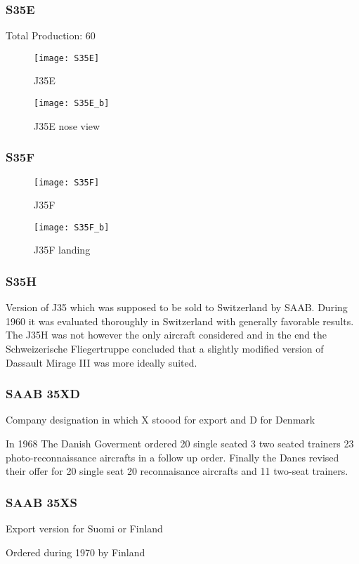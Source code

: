 \subsubsection{S35E}
    \begin{itemize*}
        \item Total Production: 60
    \end{itemize*}


\begin{figure}[H]
    \centering
    \texttt{[image: S35E]}
    \caption{J35E}
\end{figure}
\begin{figure}[H]
    \centering
    \texttt{[image: S35E\_b]}
    \caption{J35E nose view}
\end{figure}

\subsubsection{S35F}
\begin{figure}[H]
    \centering
    \texttt{[image: S35F]}
    \caption{J35F}
\end{figure}
\begin{figure}[H]
    \centering
    \texttt{[image: S35F\_b]}
    \caption{J35F landing}
\end{figure}

\subsubsection{S35H}
Version of J35 which was supposed to be sold to Switzerland by SAAB. During 1960 it 
was evaluated thoroughly in Switzerland with generally favorable results.
The J35H was not however the only aircraft considered and in the end the Schweizerische
Fliegertruppe concluded that a slightly modified version of Dassault Mirage III was more ideally suited.

\subsubsection{SAAB 35XD}
\begin{itemize*}
    \item Company designation in which X stoood for export and D for Denmark
    \item In 1968 The Danish Goverment ordered 20 single seated 3 two seated trainers 
        23 photo-reconnaissance aircrafts in a follow up order. Finally the Danes revised their offer for 20 single seat 
        20 reconnaisance aircrafts and 11 two-seat trainers.
\end{itemize*}

\subsubsection{SAAB 35XS}
\begin{itemize*}
    \item Export version for Suomi or Finland
    \item Ordered during 1970 by Finland
\end{itemize*}
